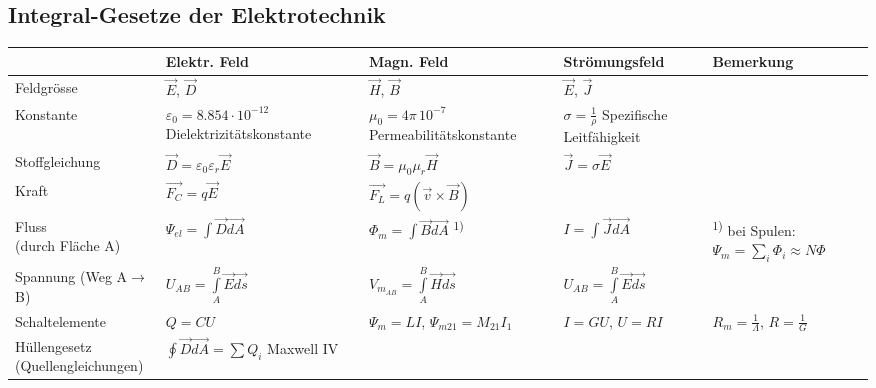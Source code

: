 \subsection{Integral-Gesetze der Elektrotechnik}
	
	\begin{tabular}{|p{2.5cm}||p{2.7cm}|p{4cm}|p{2.7cm}|p{5cm}|}
	\hline
	& \textbf{Elektr. Feld} & \textbf{Magn. Feld} & \textbf{Strömungsfeld} & \textbf{Bemerkung}\\
	\hline \hline
	Feldgrösse & $\vec{E}$, $\vec{D}$ & $\vec{H}$, $\vec{B}$
	& $\vec{E}$, $\vec{J}$ &\\
	\hline
	Konstante
		& \parbox{2.7cm}{$\varepsilon_0 = 8.854 \cdot 10^{-12}$\\
		{\tiny Dielektrizitätskonstante} \vspace{.1cm}} 
		& \parbox{4cm}{$\mu_0 = 4 \pi \, 10^{-7}$\\ {\tiny Permeabilitätskonstante} \vspace{.1cm}} 
		& \parbox{2.7cm}{$\sigma=\frac{1}{\rho}$ \\ {\tiny Spezifische
		Leitfähigkeit}\vspace{.1cm}} &\\ 
	\hline
	Stoffgleichung & $\vec{D}=\varepsilon_0\varepsilon_r\vec{E}$ & $\vec{B}=\mu_0\mu_r\vec{H}$
	& $\vec{J}=\sigma\vec{E}$ &
	\\
	\hline
	Kraft & $\vec{F_C}=q\vec{E}$ & $\vec{F_L}=q(\vec{v}\times\vec{B})$ &&\\
	\hline
	\parbox{2.5cm}{Fluss\\{\tiny (durch Fläche A)}} & $\Psi_{el}=\int\vec{D}\vec{dA}$ &
	$\Phi_m=\int\vec{B}\vec{dA}$ \textsuperscript{1)}&
	$I=\int\vec{J}\vec{dA}$ & \textsuperscript{1)} bei Spulen:
	$\Psi_m=\sum_i\Phi_i\approx N \Phi$\\
	\hline
	\parbox{2.5cm}{Spannung \\{\tiny (Weg A$\to$B)}} & $U_{AB}=\int\limits_{A}^B
	\vec{E}\vec{ds}$ & $V_{m_{AB}}=\int\limits_{A}^B\vec{H}\vec{ds}$ 
	& $U_{AB}=\int\limits_{A}^B\vec{E}\vec{ds}$ & \\
	\hline
	Schaltelemente & $Q=CU$ & $\Psi_m=LI$, $\Psi_{m21}=M_{21}I_1$
	& $I=GU$, $U=RI$ & $R_m=\frac{1}{\Lambda}$, $R=\frac{1}{G}$\\
	\hline
	\parbox{2.5cm}{Hüllengesetz \\ {\tiny (Quellengleichungen)}}
		& \parbox{2.7cm}{
			\vspace{.1cm}$\oint\vec{D}\vec{dA}=\sum Q_i$ \vspace{.1cm}
			Maxwell IV
}
\end{tabular}

